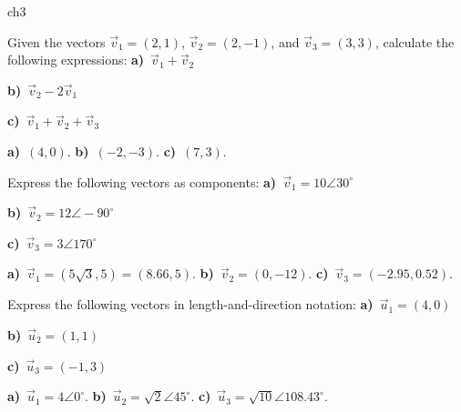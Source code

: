 
\begin{exercises}{ch3}

	\begin{exercise}
		Given the vectors $\vec{v}_1=(2,1)$, $\vec{v}_2=(2,-1)$, and $\vec{v}_3=(3,3)$,
		calculate the following expressions:
		\threecol
			\textbf{a)}~$\vec{v}_1 + \vec{v}_2$
			
			\textbf{b)}~$\vec{v}_2 - 2\vec{v}_1$
			
			\textbf{c)}~$\vec{v}_1 + \vec{v}_2 + \vec{v}_3$
		\endthreecol
		
		\begin{eanswer}\textbf{a)}~$(4,0)$.
					\textbf{b)}~$(-2,-3)$.
					\textbf{c)}~$(7,3)$.\end{eanswer}
	\end{exercise}

	\begin{exercise}	\label{exercise:vector-polar-to-cartesian-conversion}
		Express the following vectors as components:
		\threecol
			\textbf{a)}~$\vec{v}_1 =10\angle30^\circ$
			
			\textbf{b)}~$\vec{v}_2 = 12\angle\!-\!90^\circ$
			
			\textbf{c)}~$\vec{v}_3 = 3\angle170^\circ$
		\endthreecol

		\begin{eanswer}\textbf{a)}~$\vec{v}_1=(5\sqrt{3},5)=(8.66,5)$.
					\textbf{b)}~$\vec{v}_2=(0,-12)$.
					\textbf{c)}~$\vec{v}_3=(-2.95,0.52)$.\end{eanswer}
	\end{exercise}


	\begin{exercise}	\label{exercise:vector-cartesian-to-polar-conversion}
		Express the following vectors in length-and-direction notation:
		\threecol
			\textbf{a)}~$\vec{u}_1 = (4,0)$
			
			\textbf{b)}~$\vec{u}_2 = (1,1)$
			
			\textbf{c)}~$\vec{u}_3 = (-1,3)$
		\endthreecol

		\begin{eanswer}\textbf{a)}~$\vec{u}_1=4\angle 0^\circ$. 
					\textbf{b)}~$\vec{u}_2=\sqrt{2}\angle 45^\circ$.
					\textbf{c)}~$\vec{u}_3=\sqrt{10}\angle108.43^\circ$.\end{eanswer}
	\end{exercise}



%			
%			
%		




\end{exercises}

